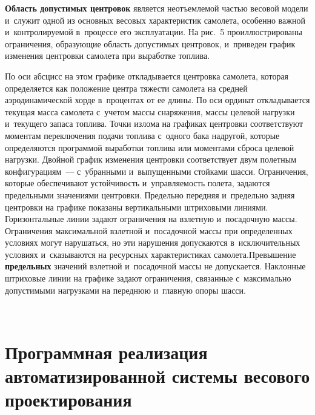 \begin{multicols}{2}
  \textbf{Область допустимых центровок} является неотъемлемой частью 
весовой модели и~служит одной из основных весовых характеристик самолета, 
особенно важной и~контролируемой в~процессе его эксплуатации. На рис.~5 
проиллюстрированы ограничения, образующие область допустимых центровок, 
и~приведен график изменения центровки самолета при выработке топлива. 



  По оси абсцисс на этом графике откладывается центровка самолета, которая 
определяется как положение центра тяжести самолета на средней 
аэро\-ди\-на\-ми\-че\-ской хорде в~процентах от ее длины. По оси ординат 
откладывается текущая масса самолета с~учетом массы снаряжения, массы 
целевой нагрузки и~текущего запаса топлива. Точки излома на графиках 
центровки соответствуют моментам переключения подачи топлива с~одного 
бака на\linebreak другой, которые определяются программой выработки топлива или 
моментами сброса целевой нагрузки. Двойной график изменения центровки 
соответствует двум полетным конфигурациям~--- с~убранными 
и~выпущенными стойками шасси. Ограничения, которые обеспечивают 
устой\-чи\-вость и~управ\-ля\-емость полета, задаются предельными значениями 
центровки. Предельно передняя и~предельно задняя центровки на графике 
показаны вертикаль\-ными штриховыми линиями. Горизонтальные линии задают 
ограничения на взлетную и~посадочную массы. Ограничения максимальной 
взлетной и~посадочной массы при определенных условиях могут нарушаться, 
но эти нарушения допускаются в~исключительных условиях и~сказываются на 
ресурсных характеристиках самолета.\linebreak Превышение \textbf{предельных} 
значений взлетной и~посадочной массы не допускается. Наклонные штриховые 
линии на графике задают ограничения, связанные с~максимально допустимыми 
нагрузками на переднюю и~главную опоры шасси.  

\begin{figure*} %
\vspace*{1pt}
 \begin{center}
 \mbox{%
 \epsfxsize=165mm 
 }
 \end{center}
\vspace*{-9pt}
\end{figure*} 


\section{Программная реализация автоматизированной системы весового
проектирования}


\end{multicols}
